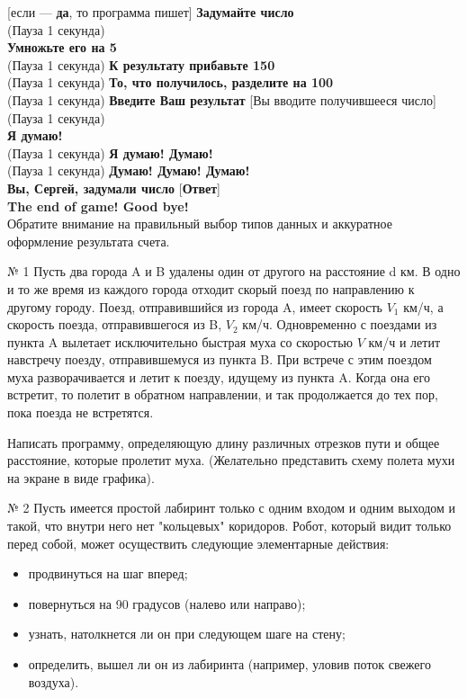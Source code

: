 [если ---  {\bf да}, то программа пишет] {\bf Задумайте число}\\
(Пауза 1 секунда)\\
 {\bf Умножьте его на 5}\\
(Пауза 1 секунда)  {\bf К результату прибавьте 150}\\
(Пауза 1 секунда)  {\bf То, что получилось, разделите на 100}\\
(Пауза 1 секунда)  {\bf Введите Ваш результат}  [Вы вводите получившееся число]\\
(Пауза 1 секунда)\\
 {\bf Я думаю!}\\
(Пауза 1 секунда)  {\bf Я думаю! Думаю!}\\
(Пауза 1 секунда)  {\bf Думаю! Думаю! Думаю!}\\
 {\bf Вы, Сергей, задумали число} [{\bf Ответ}]\\
 {\bf The end of game! Good bye!}\\

Обратите внимание на правильный выбор типов данных и аккуратное оформление результата счета.

№ 1 Пусть два города A и B удалены один от другого на расстояние d км. В одно и то же время из каждого города отходит скорый поезд по направлению к другому городу. Поезд, отправившийся из города A, имеет скорость $V_1$ км/ч, а скорость поезда, отправившегося из B, $V_2$ км/ч. Одновременно с поездами из пункта A вылетает исключительно быстрая муха со скоростью $V$ км/ч и летит навстречу поезду, отправившемуся из пункта B. При встрече с этим поездом муха разворачивается и летит к поезду, идущему из пункта A. Когда она его встретит, то полетит в обратном направлении, и так продолжается до тех пор, пока поезда не встретятся.

Написать программу, определяющую длину различных отрез­ков пути и общее расстояние, которые пролетит муха. (Желательно представить схему полета мухи на экране в виде графика).

№ 2 Пусть имеется простой лабиринт только с одним входом и одним выходом и такой, что внутри него нет "кольцевых" коридоров. Робот, который видит только перед собой, может осуще­ствить следующие элементарные действия:
\begin{itemize}
	\item продвинуться на шаг вперед;
	\item повернуться на 90 градусов (налево или направо);
	\item узнать, натолкнется ли он при следующем шаге на стену;
	\item определить, вышел ли он из лабиринта (например, уловив поток свежего воздуха).
\end{itemize}

